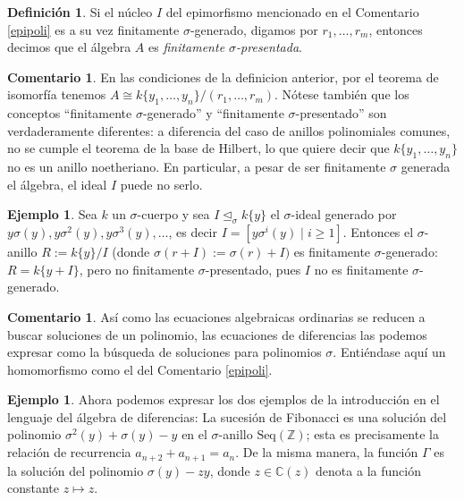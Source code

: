 \documentclass[letterpaper]{article}
\def\Z{\mathbb{Z}}
\def\C{\mathbb{C}}
\def\s{\sigma}
\def\si{\unlhd_{\sigma}}
\theoremstyle{definition}
\newtheorem{ex}[Satz]{Ejemplo}
\newtheorem{rem}[Satz]{Comentario}
\newtheorem{defn}[Satz]{Definici\'on}
\begin{document}
\begin{defn}
Si el n\'ucleo $I$ del epimorfismo mencionado en el Comentario \ref{epipoli} es a su vez finitamente $\sigma$-generado, digamos por $r_1, \ldots, r_m$, entonces decimos que el \'algebra $A$ es \emph{finitamente $\sigma$-presentada}.
\end{defn}

\begin{rem}
En las condiciones de la definicion anterior, por el teorema de isomorf\'ia tenemos $A \cong k\{y_1, \ldots, y_n\}/(r_1,\ldots,r_m)$. N\'otese tambi\'en que los conceptos ``finitamente $\sigma$-generado'' y ``finitamente $\sigma$-presentado'' son ver\-da\-de\-ra\-men\-te diferentes: a diferencia del caso de anillos polinomiales comunes, no se cumple el teorema de la base de Hilbert, lo que quiere decir que $k\{y_1, \ldots, y_n\}$ no es un anillo noetheriano. En particular, a pesar de ser 
finitamente $\sigma$ generada el \'algebra, el ideal $I$ puede no serlo.
\end{rem}

\begin{ex}
Sea $k$ un $\sigma$-cuerpo y sea $I \si k\{y\} $ el $\sigma$-ideal generado por $y\s(y), y\s^2(y), y\s^3(y), \ldots$, es decir $I = [y \s^i(y) \mid i\geq 1]$. Entonces el $\sigma$-anillo $R := k\{y\}/I$ (donde $\s (r + I) := \s(r) + I)$ es 
finitamente $\sigma$-generado: $R = k\{ y + I \}$, pero no finitamente $\sigma$-presentado, pues $I$ no es finitamente $\sigma$-generado.
\end{ex}

\begin{rem}
As\'i como las ecuaciones algebraicas ordinarias se reducen a buscar soluciones de un polinomio, 
las ecuaciones de diferencias las podemos expresar como la b\'usqueda de soluciones para  polinomios $\sigma$. Enti\'endase aqu\'i un homomorfismo como el del Comentario \ref{epipoli}.
\end{rem}

\begin{ex}
Ahora podemos expresar los dos ejemplos de la introducci\'on en el lenguaje del \'algebra de diferencias:
La sucesi\'on de Fibonacci es una soluci\'on del polinomio $\sigma^2(y) + \sigma(y) - y$ en el $\sigma$-anillo  $\text{Seq}(\Z)$; esta es precisamente la relaci\'on de recurrencia $a_{n+2} + a_{n+1} = a_n$.
De la misma manera, la funci\'on $\Gamma$ es la soluci\'on del polinomio $\sigma(y) - zy$, donde $z \in \C(z)$ denota a la funci\'on constante $z \mapsto z$.
\end{ex}
\end{document}
